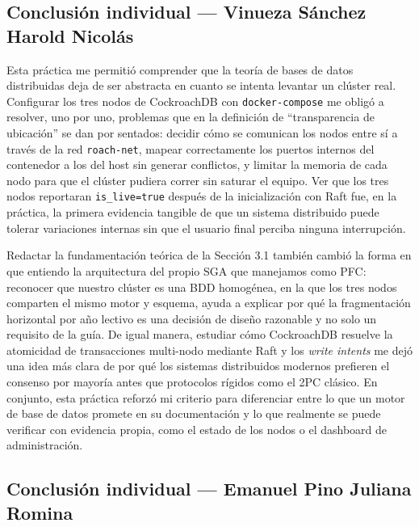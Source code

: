 \documentclass[10pt,a4paper]{article}
\begin{document}
\subsection*{Conclusión individual --- Vinueza Sánchez Harold Nicolás}

Esta práctica me permitió comprender que la teoría de bases de datos distribuidas deja
de ser abstracta en cuanto se intenta levantar un clúster real. Configurar los tres
nodos de CockroachDB con \texttt{docker-compose} me obligó a resolver, uno por uno,
problemas que en la definición de ``transparencia de ubicación'' se dan por sentados:
decidir cómo se comunican los nodos entre sí a través de la red \texttt{roach-net},
mapear correctamente los puertos internos del contenedor a los del host sin generar
conflictos, y limitar la memoria de cada nodo para que el clúster pudiera correr sin
saturar el equipo. Ver que los tres nodos reportaran \texttt{is\_live=true} después de
la inicialización con Raft fue, en la práctica, la primera evidencia tangible de que
un sistema distribuido puede tolerar variaciones internas sin que el usuario final
perciba ninguna interrupción.

Redactar la fundamentación teórica de la Sección 3.1 también cambió la forma en que
entiendo la arquitectura del propio SGA que manejamos como PFC: reconocer que nuestro
clúster es una BDD homogénea, en la que los tres nodos comparten el mismo motor y
esquema, ayuda a explicar por qué la fragmentación horizontal por año lectivo es una
decisión de diseño razonable y no solo un requisito de la guía. De igual manera,
estudiar cómo CockroachDB resuelve la atomicidad de transacciones multi-nodo mediante
Raft y los \emph{write intents} me dejó una idea más clara de por qué los sistemas
distribuidos modernos prefieren el consenso por mayoría antes que protocolos rígidos
como el 2PC clásico. En conjunto, esta práctica reforzó mi criterio para diferenciar
entre lo que un motor de base de datos promete en su documentación y lo que realmente
se puede verificar con evidencia propia, como el estado de los nodos o el dashboard de
administración.

\subsection*{Conclusión individual --- Emanuel Pino Juliana Romina}
\end{document}
